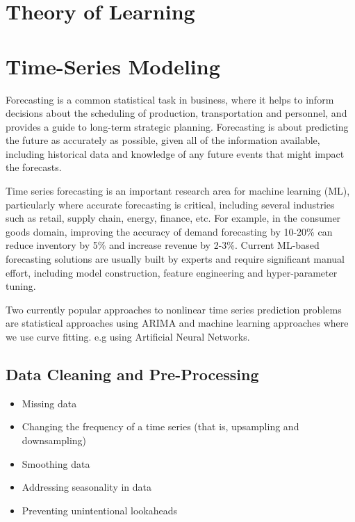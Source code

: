 \documentclass[openany]{book}
\begin{document}
\chapter{Theory of Learning}




\chapter{Time-Series Modeling}

Forecasting is a common statistical task in business, where it helps to inform decisions about the scheduling of production, transportation and personnel, and provides a guide to long-term strategic planning. Forecasting is about predicting the future as accurately as possible, given all of the information available, including historical data and knowledge of any future events that might impact the forecasts.

Time series forecasting is an important research area for machine learning (ML), particularly where accurate forecasting is critical, including several industries such as retail, supply chain, energy, finance, etc. For example, in the consumer goods domain, improving the accuracy of demand forecasting by 10-20\% can reduce inventory by 5\% and increase revenue by 2-3\%. Current ML-based forecasting solutions are usually built by experts and require significant manual effort, including model construction, feature engineering and hyper-parameter tuning.

Two currently popular approaches to nonlinear time series prediction problems are statistical approaches using ARIMA and machine learning approaches where we use curve fitting. e.g using Artificial Neural Networks.


\section{Data Cleaning and Pre-Processing}

\begin{itemize}
    \item Missing data
    \item Changing the frequency of a time series (that is, upsampling and downsampling)
    \item Smoothing data
    \item Addressing seasonality in data
    \item Preventing unintentional lookaheads
\end{itemize}
\end{document}
